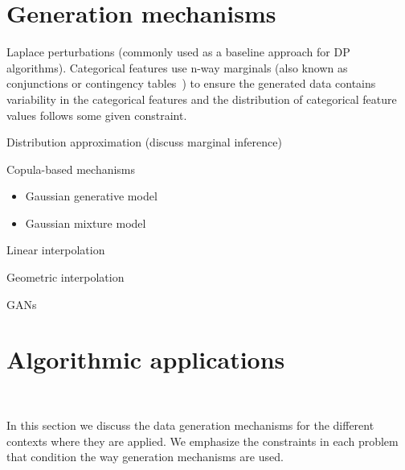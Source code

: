 \documentclass[parskip=full]{scrartcl}
\begin{document}
% 
% 
% 
% 

\section{Generation mechanisms}

Laplace perturbations (commonly used as a baseline approach for DP
algorithms). Categorical features use n-way marginals (also known as
conjunctions or contingency tables~\cite{gaboardi2014dual}) to ensure the generated data contains
variability in the categorical features and the distribution of categorical
feature values follows some given constraint.

Distribution approximation (discuss marginal inference)

Copula-based mechanisms

\begin{itemize}
    \item Gaussian generative model 
    \item Gaussian mixture model 
\end{itemize}

Linear interpolation

Geometric interpolation

GANs


\section{Algorithmic applications}~\label{sec:algorithmic-applications}

In this section we discuss the data generation mechanisms for the different
contexts where they are applied. We emphasize the constraints in each problem
that condition the way generation mechanisms are used.
\end{document}
